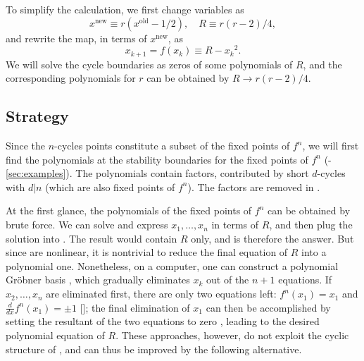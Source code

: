 \documentclass{ws-ijbc}
\begin{document}
To simplify the calculation, we first change variables \cite{mandelbrot, brown1} as
%
\[
    x^{\mathrm{new}} \equiv r(x^{\mathrm{old}} - 1/2),
    \quad R \equiv r(r-2)/4,
\]
%
and rewrite the map, in terms of $x^{\mathrm{new}}$, as
%
\begin{equation}
  x_{k+1} = f(x_k) \equiv R - {x_k}^2.
\label{eq:logmaps}
\end{equation}
%
%
We will solve the cycle boundaries as zeros of some polynomials of $R$,
and the corresponding polynomials for $r$ can be obtained by $R \rightarrow r(r-2)/4$.
%
%






\subsection{Strategy}

Since the $n$-cycles points constitute a subset of the fixed points of $f^n$,
we will first find
  the polynomials at the stability boundaries
  for the fixed points of $f^n$
  (-\ref{sec:examples}).
The polynomials contain
  factors, contributed by short $d$-cycles with $d|n$
  (which are also fixed points of $f^n$).
The factors are removed in .



At the first glance, the polynomials of the fixed points of $f^n$
  can be obtained by brute force.
We can solve
   and express $x_1, \ldots, x_n$
  in terms of $R$,
  and then plug the solution into .
The result would contain $R$ only,
  and is therefore the answer.
But since  are nonlinear,
  it is nontrivial to reduce the final equation of $R$
  into a polynomial one.
Nonetheless, on a computer, one can
  construct a polynomial Gr\"obner basis \cite{kk1},
  which gradually eliminates $x_k$ out of the $n+1$ equations.
If $x_2, \dots, x_n$ are eliminated first,
  there are only two equations left:
  $f^n(x_1) = x_1$
  and
  $\frac{d}{dx}f^n (x_1) = \pm 1$
  [];
  the final elimination of $x_1$ can then be accomplished
  by setting the resultant of the two equations
  to zero \cite{burm},
  leading to the desired polynomial equation of $R$.
%
These approaches, however, do not
  exploit the cyclic structure of ,
  and can thus be improved by the following alternative.
\end{document}
